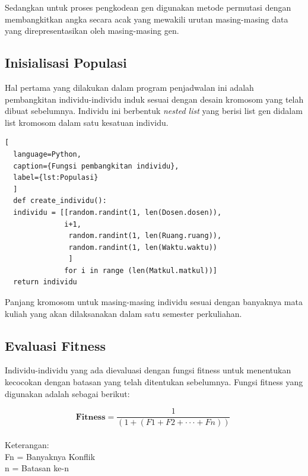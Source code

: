 Sedangkan untuk proses pengkodean gen digunakan metode permutasi dengan \linebreak membangkitkan angka secara acak yang mewakili urutan masing-masing data yang \linebreak direpresentasikan oleh masing-masing gen.

\subsection{Inisialisasi Populasi}
Hal pertama yang dilakukan dalam program penjadwalan ini adalah pembangkitan \linebreak individu-individu induk sesuai dengan desain kromosom yang telah dibuat sebelumnya. Individu ini berbentuk \emph{nested list} yang berisi list gen didalam list kromosom dalam satu kesatuan individu.  
\begin{lstlisting}[
  language=Python,
  caption={Fungsi pembangkitan individu},
  label={lst:Populasi}
  ]
  def create_individu():
  individu = [[random.randint(1, len(Dosen.dosen)), 
              i+1,
               random.randint(1, len(Ruang.ruang)),
               random.randint(1, len(Waktu.waktu))
               ] 
              for i in range (len(Matkul.matkul))]
  return individu
\end{lstlisting}
Panjang kromosom untuk masing-masing individu sesuai dengan banyaknya mata kuliah yang akan dilaksanakan dalam satu semester perkuliahan.
\subsection{Evaluasi Fitness}
  
  Individu-individu yang ada dievaluasi dengan fungsi fitness untuk menentukan kecocokan dengan batasan yang telah ditentukan sebelumnya. 
  Fungsi fitness yang digunakan adalah sebagai berikut:
  
  \begin{equation}
    \label{eq:fitness2}
    \mathbf{Fitness} = \frac{1}{(1 + (F1 + F2 + \cdot \cdot \cdot +  Fn))}\; 
  \end{equation}\\
  Keterangan:\\
  Fn = Banyaknya Konflik\\
  n  = Batasan ke-n\\

